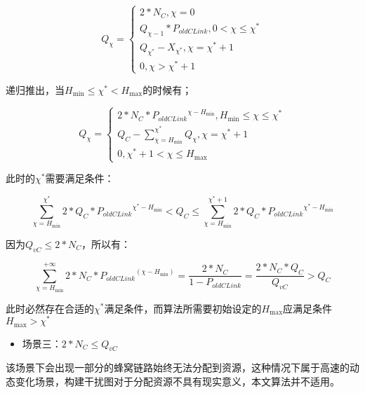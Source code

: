 \documentclass[figurelist,tablelist,algorithmlist,nomlist,masters]{seuthesix}
\begin{document}
	\begin{equation}\label{eq3.1}
	Q_{\chi } = \left\{ \begin{array}{l}
	2*N_C,\chi = 0\\
	Q_{\chi - 1}*{P_{oldCLink}},0 < \chi  \le \chi ^*\\
	Q_{\chi ^*} - X_{\chi ^*},\chi  = \chi ^* + 1\\
	0,\chi  > \chi ^* + 1
	\end{array} \right.
	\end{equation}
	
	递归推出，当$H_{\min } \le \chi ^* < H_{\max }$的时候有；
	
	\begin{equation}\label{eq3.1}
	Q_\chi  = \left\{ \begin{array}{l}
	2*N_C*{P_{oldCLink}}^{\chi - H_{\min }},H_{\min } \le \chi  \le \chi ^*\\
	Q_C - \sum\limits_{\chi = H_{\min }}^{\chi ^*} {Q_{\chi }} ,\chi  = {\chi ^* + 1}\\
	0,\chi ^* + 1 < \chi  \le {H_{\max }}
	\end{array} \right.
	\end{equation}
	
	此时的$\chi ^*$需要满足条件：
	
	\begin{equation}\label{eq3.1}
	\sum\limits_{\chi = H_{\min }}^{\chi ^*} {2*Q_C*{P_{oldCLink}}^{\chi ^* - H_{\min }}} < Q_C \le \sum\limits_{\chi = H_{\min }}^{\chi ^* + 1} {2*Q_C*{P_{oldCLink}}^{\chi ^* - H_{\min }}}
	\end{equation}
	
	因为$Q_{vC} \le 2*N_C$，所以有：
	
	\begin{equation}\label{eq3.1}
	\sum\limits_{\chi = H_{\min }}^{ + \infty } {2*N_C*{P_{oldCLink}}^(\chi - H_{\min })}  = \frac{{2*N_C}}{{1 - {P_{oldCLink}}}} = \frac{{2*N_C*Q_C}}{{Q_{vC}}} > Q_C
	\end{equation}
	
	此时必然存在合适的$\chi ^*$满足条件，而算法所需要初始设定的$H_{\max }$应满足条件$H_{\max } > \chi ^*$
	
	\begin{itemize}
		\item 场景三：$2*N_C \le Q_{vC}$
	\end{itemize}
	
	该场景下会出现一部分的蜂窝链路始终无法分配到资源，这种情况下属于高速的动态变化场景，构建干扰图对于分配资源不具有现实意义，本文算法并不适用。
	
\end{document}
